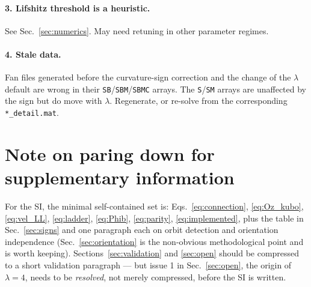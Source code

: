\documentclass[11pt]{article}
\newcommand{\code}[1]{\texttt{#1}}
\begin{document}
\paragraph{3. Lifshitz threshold is a heuristic.}
See Sec.~\ref{sec:numerics}.  May need retuning in other parameter
regimes.

\paragraph{4. Stale data.}
Fan files generated before the curvature-sign correction and the change
of the $\lambda$ default are wrong in their
\code{SB}/\code{SBM}/\code{SBMC} arrays.  The \code{S}/\code{SM} arrays
are unaffected by the sign but do move with $\lambda$.  Regenerate, or
re-solve from the corresponding \code{*\_detail.mat}.

\section*{Note on paring down for supplementary information}

For the SI, the minimal self-contained set is:
Eqs.~\eqref{eq:connection}, \eqref{eq:Oz_kubo}, \eqref{eq:vel_LL},
\eqref{eq:ladder}, \eqref{eq:Phib}, \eqref{eq:parity},
\eqref{eq:implemented}, plus the table in Sec.~\ref{sec:signs} and one
paragraph each on orbit detection and orientation independence
(Sec.~\ref{sec:orientation} is the non-obvious methodological point and
is worth keeping).  Sections~\ref{sec:validation} and \ref{sec:open}
should be compressed to a short validation paragraph --- but issue 1 in
Sec.~\ref{sec:open}, the origin of $\lambda = 4$, needs to be
\emph{resolved}, not merely compressed, before the SI is written.
\end{document}
